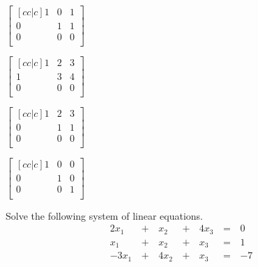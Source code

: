 \documentclass{article}
\begin{document}
\begin{readinessAssuranceTest}
  \begin{multicols}{4}
  \begin{readinessAssuranceTestChoices}
  \item
    \(
      \begin{bmatrix}[cc|c]
        1 & 0 & 1 \\
        0 & 1 & 1 \\
        0 & 0 & 0 \\
      \end{bmatrix}
    \) %
  \item
    \(
      \begin{bmatrix}[cc|c]
        1 & 2 & 3 \\
        1 & 3 & 4 \\
        0 & 0 & 0 \\
      \end{bmatrix}
    \)
  \item
    \(
      \begin{bmatrix}[cc|c]
        1 & 2 & 3 \\
        0 & 1 & 1 \\
        0 & 0 & 0 \\
      \end{bmatrix}
    \)
  \item
    \(
      \begin{bmatrix}[cc|c]
        1 & 0 & 0 \\
        0 & 1 & 0 \\
        0 & 0 & 1 \\
      \end{bmatrix}
    \) %
  \end{readinessAssuranceTestChoices}
  \end{multicols}

  \item Solve the following system of linear equations.
  \begin{alignat*}{4}
    2x_1 &\,+\,& x_2 &\,+\,& 4x_3 &\,=\,& 0 \\
     x_1 &\,+\,& x_2 &\,+\,&  x_3 &\,=\,& 1 \\
   -3x_1 &\,+\,& 4x_2 &\,+\,& x_3 &\,=\,& -7 \\
  \end{alignat*}


\end{readinessAssuranceTest}
\end{document}
